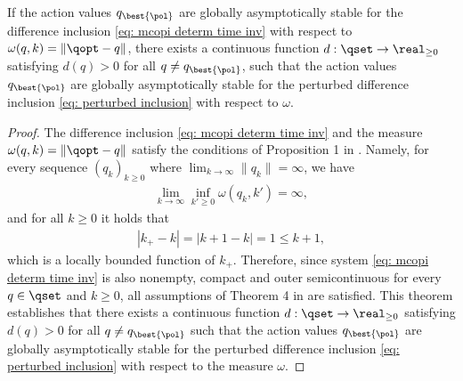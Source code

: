 \begin{lemma}
\label{thm: perturbed di converges}
    If the action values $q_{\best{\pol}}$ are globally asymptotically stable for 
    the difference inclusion \eqref{eq: mcopi determ time inv} with respect to $\omega(q, k) = \|\qopt - q\|$,
    there exists a continuous function $d : \qset \to \real_{\geq 0}$ satisfying $d(q) > 0$ for all $q \neq q_{\best{\pol}}$,
    such that the action values $q_{\best{\pol}}$ are globally asymptotically stable for the perturbed difference inclusion \eqref{eq: perturbed inclusion} with respect to $\omega$.
\end{lemma}

\begin{proof}




The difference inclusion \eqref{eq: mcopi determ time inv} and the measure $\omega(q, k) = \|\qopt-q\|$ satisfy the conditions of Proposition 1 in \citep{Kellett2007SufficientInclusions}. Namely, for every sequence $(q_k)_{k \geq 0}$ where $\lim_{k \to \infty} \|q_k\| = \infty$, we have
\begin{align*}
    \lim_{k \to \infty} \inf_{k' \geq 0} \omega( q_k, k' ) = \infty ,
\end{align*}
and for all $k \geq 0$ it holds that
\begin{align*}
    |k_+ - k| = |k+1 - k| = 1 \leq k+1 ,
\end{align*}
which is a locally bounded function of $k_+$.
Therefore, since system \eqref{eq: mcopi determ time inv} is also nonempty, compact and outer semicontinuous for every $q \in \qset$ and $k \geq 0$,
all assumptions of Theorem 4 in \citep{Kellett2007SufficientInclusions} are satisfied.
This theorem establishes that
there exists a continuous function $d : \qset \to \real_{\geq 0}$ satisfying $d(q) > 0$ for all $q \neq q_{\best{\pol}}$ such that the action values $q_{\best{\pol}}$ are globally asymptotically stable for the perturbed difference inclusion \eqref{eq: perturbed inclusion} with respect to the measure $\omega$.
\end{proof}

